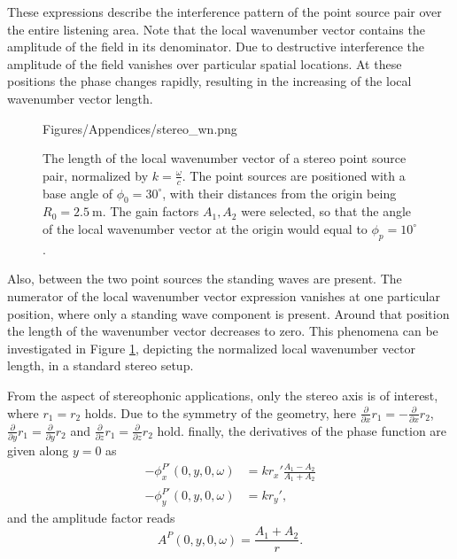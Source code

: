 These expressions describe the interference pattern of the point source pair over the entire listening area.
Note that the local wavenumber vector contains the amplitude of the field in its denominator.
Due to destructive interference the amplitude of the field vanishes over particular spatial locations.
At these positions the phase changes rapidly, resulting in the increasing of the local wavenumber vector length.
%
\begin{figure}
\small
  \begin{minipage}[c]{0.68\textwidth}
	\begin{overpic}[width = 1\columnwidth]{Figures/Appendices/stereo_wn.png}
	\end{overpic}   \end{minipage}\hfill	
	\begin{minipage}[c]{0.3\textwidth}
    \caption{The length of the local wavenumber vector of a stereo point source pair, normalized by $k = \frac{\omega}{c}$.
    The point sources are positioned with a base angle of $\phi_0 = 30^\circ$, with their distances from the origin being $R_0 = 2.5~\mathrm{m}$.
The gain factors $A_1, A_2$ were selected, so that the angle of the local wavenumber vector at the origin would equal to $\phi_p = 10^\circ$. }
\label{fig:App:stereo_wn}   \end{minipage}
\end{figure} 
Also, between the two point sources the standing waves are present.
The numerator of the local wavenumber vector expression vanishes at one particular position, where only a standing wave component is present.
Around that position the length of the wavenumber vector decreases to zero.
This phenomena can be investigated in Figure \ref{fig:App:stereo_wn}, depicting the normalized local wavenumber vector length, in a standard stereo setup.

From the aspect of stereophonic applications, only the stereo axis is of interest, where $r_1 = r_2$ holds.
Due to the symmetry of the geometry, here $\frac{\partial}{\partial x} r_1 = - \frac{\partial}{\partial x} r_2$, $\frac{\partial}{\partial y} r_1 = \frac{\partial}{\partial y} r_2$ and $\frac{\partial}{\partial z} r_1 = \frac{\partial}{\partial z} r_2$ hold. 
finally, the derivatives of the phase function are given along $y = 0$ as
\begin{align}
-\phi^{P'}_x(0,y,0,\omega) &= k r_x' \frac{ A_1  - A_2 
 }{ A_1 + A_2} \\
-\phi^{P'}_y(0,y,0,\omega) &= k r_y',
\end{align}
and the amplitude factor reads
\begin{equation}
A^P(0,y,0,\omega) = \frac{A_1 +  A_2}{r}.
\label{Eq:AppB:stereo_amplitude}
\end{equation}